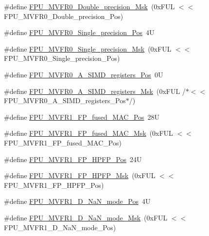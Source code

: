 \begin{DoxyCompactItemize}
\item 
\#define \hyperlink{group___c_m_s_i_s___f_p_u_ga3f2c8c6c759ffe70f548a165602ea901}{F\+P\+U\+\_\+\+M\+V\+F\+R0\+\_\+\+Double\+\_\+precision\+\_\+\+Msk}~(0x\+F\+U\+L $<$$<$ F\+P\+U\+\_\+\+M\+V\+F\+R0\+\_\+\+Double\+\_\+precision\+\_\+\+Pos)
\item 
\#define \hyperlink{group___c_m_s_i_s___f_p_u_ga1b4e9fe31992b1495c7a158747d42571}{F\+P\+U\+\_\+\+M\+V\+F\+R0\+\_\+\+Single\+\_\+precision\+\_\+\+Pos}~4U
\item 
\#define \hyperlink{group___c_m_s_i_s___f_p_u_ga95008f205c9d25e4ffebdbdc50d5ae44}{F\+P\+U\+\_\+\+M\+V\+F\+R0\+\_\+\+Single\+\_\+precision\+\_\+\+Msk}~(0x\+F\+U\+L $<$$<$ F\+P\+U\+\_\+\+M\+V\+F\+R0\+\_\+\+Single\+\_\+precision\+\_\+\+Pos)
\item 
\#define \hyperlink{group___c_m_s_i_s___f_p_u_gaa1de44af3e3162c8c176a57564611618}{F\+P\+U\+\_\+\+M\+V\+F\+R0\+\_\+\+A\+\_\+\+S\+I\+M\+D\+\_\+registers\+\_\+\+Pos}~0U
\item 
\#define \hyperlink{group___c_m_s_i_s___f_p_u_ga118f13f9562805356e92b5ad52573021}{F\+P\+U\+\_\+\+M\+V\+F\+R0\+\_\+\+A\+\_\+\+S\+I\+M\+D\+\_\+registers\+\_\+\+Msk}~(0x\+F\+U\+L /$\ast$$<$$<$ F\+P\+U\+\_\+\+M\+V\+F\+R0\+\_\+\+A\+\_\+\+S\+I\+M\+D\+\_\+registers\+\_\+\+Pos$\ast$/)
\item 
\#define \hyperlink{group___c_m_s_i_s___f_p_u_ga68c53771f02f4c73122a7b40796549cc}{F\+P\+U\+\_\+\+M\+V\+F\+R1\+\_\+\+F\+P\+\_\+fused\+\_\+\+M\+A\+C\+\_\+\+Pos}~28U
\item 
\#define \hyperlink{group___c_m_s_i_s___f_p_u_gaf5129ab18948ff573a1ab29f0be47bc2}{F\+P\+U\+\_\+\+M\+V\+F\+R1\+\_\+\+F\+P\+\_\+fused\+\_\+\+M\+A\+C\+\_\+\+Msk}~(0x\+F\+U\+L $<$$<$ F\+P\+U\+\_\+\+M\+V\+F\+R1\+\_\+\+F\+P\+\_\+fused\+\_\+\+M\+A\+C\+\_\+\+Pos)
\item 
\#define \hyperlink{group___c_m_s_i_s___f_p_u_ga02ceac0abcbdc8670633056bec005bfd}{F\+P\+U\+\_\+\+M\+V\+F\+R1\+\_\+\+F\+P\+\_\+\+H\+P\+F\+P\+\_\+\+Pos}~24U
\item 
\#define \hyperlink{group___c_m_s_i_s___f_p_u_gafe29dd327ed3b723b3f01759568e116d}{F\+P\+U\+\_\+\+M\+V\+F\+R1\+\_\+\+F\+P\+\_\+\+H\+P\+F\+P\+\_\+\+Msk}~(0x\+F\+U\+L $<$$<$ F\+P\+U\+\_\+\+M\+V\+F\+R1\+\_\+\+F\+P\+\_\+\+H\+P\+F\+P\+\_\+\+Pos)
\item 
\#define \hyperlink{group___c_m_s_i_s___f_p_u_gae34d7ce42e50e2f1ea3e654fd3ba690a}{F\+P\+U\+\_\+\+M\+V\+F\+R1\+\_\+\+D\+\_\+\+Na\+N\+\_\+mode\+\_\+\+Pos}~4U
\item 
\#define \hyperlink{group___c_m_s_i_s___f_p_u_gad6af7c4632dba5a417307d456fe9b8a7}{F\+P\+U\+\_\+\+M\+V\+F\+R1\+\_\+\+D\+\_\+\+Na\+N\+\_\+mode\+\_\+\+Msk}~(0x\+F\+U\+L $<$$<$ F\+P\+U\+\_\+\+M\+V\+F\+R1\+\_\+\+D\+\_\+\+Na\+N\+\_\+mode\+\_\+\+Pos)
$$
\end{DoxyCompactItemize}

